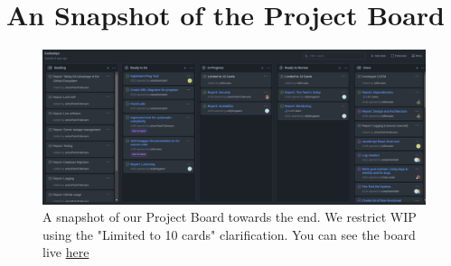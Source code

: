 \section{An Snapshot of the Project Board}
\label{app:kanbamps}

\begin{figure}[H]
    \centering
    \includegraphics[width=\textwidth]{images/Kanbamps.png}
    \caption{A snapshot of our Project Board towards the end. We restrict WIP using the "Limited to 10 cards" clarification. You can see the board live \href{https://github.com/antonPalmFolkmann/DevOps2022/projects/3}{here}}
    \label{app:fig:kanbamps}
\end{figure}